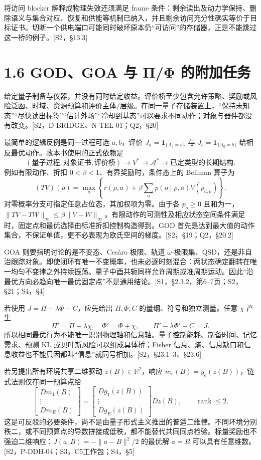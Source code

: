 \documentclass[
  11pt,
  oneside]{book}
\begin{document}
将访问 blocker 解释成物理失效还须满足 frame
条件：剩余读出及动力学保持、删除语义与集合对应、恢复和供能等机制已纳入，并且剩余访问充分性确实等价于目标证书。切断一个供电端口可能同时破坏原本仍``可访问''的存储器，正是不能跳过这一桥的例子。{[}S2，§13.3{]}

\section{1.6 GOD、GOA 与 Π/Φ 的附加任务}

给定量子制备与仪器，并没有同时给定收益。评价桥至少包含允许策略、奖励或风险泛函、时域、资源预算和评价主体/层级。在同一量子存储装置上，``保持未知态''``尽快读出标签''``估计外场''``冷却到基态''可以要求不同动作；对象与器件都没有改变。{[}S2，D-BRIDGE、N-TEL-01；Q2，§20{]}

最简单的逻辑反例是同一过程可选 \(a,b\)，评价
\(J_a=\mathbf1_{\{A_0=a\}}\) 与 \(J_b=\mathbf1_{\{A_0=b\}}\)
给相反最优动作。故本书使用的正式依赖是 \[
(\text{量子过程},\text{对象证书},\text{评价桥})
\longrightarrow V^*\longrightarrow\mathcal A^*\longrightarrow\text{已定类型的长期结构}.
\] 例如有限动作、折扣 \(0<\beta<1\)、有界奖励时，条件态上的 Bellman
算子为 \[
(TV)(\rho)=\max_a\left\{r(\rho,a)+\beta\sum_o p(o\mid\rho,a)
V(\rho_{a,o})\right\}.
\] 对零概率分支可指定任意占位态，其加权项为零。由于各 \(p_o\ge0\)
且和为一，\(\|TV-TW\|_\infty\le\beta\|V-W\|_\infty\)。有限动作的可测性及相应状态空间条件满足时，固定点和最优选择由标准折扣控制构造得到。GOD
首先是达到最大值的动作集合，不保证单值，更不必表现为欧氏空间的梯度。{[}S2，§19；Q2，§20.2{]}

GOA 则要指明讨论的是不变态、Cesàro 极限、轨道
\(\omega\)-极限集、QSD，还是非自治跟踪对象。即使闭环有唯一不变概率，也未必逐时刻混合：两状态确定翻转在唯一均匀不变律之外持续振荡。量子中酉共轭同样允许周期或准周期运动。因此``沿最优方向必趋向唯一最优固定点''不是通用结论。{[}S1，§2.3.2，第6--7页；S2，§21；S4，§4{]}

若使用 \(J=\Pi-\lambda\Phi-C\)，应先给出 \(\Pi,\Phi,C\)
的量纲、符号和独立测量。任意 \(\chi\) 产生 \[
\Pi'=\Pi+\lambda\chi,\quad \Phi'=\Phi+\chi,
\qquad \Pi'-\lambda\Phi'-C=J.
\]
所以相同最优行为不能唯一识别物理轴和信息轴。量子控制能耗、制备时间、记忆需求、预测
KL 或贝叶斯风险可以组成具体桥；Fisher
信息、熵、信息缺口和信息收益也不能只因都叫``信息''就同号相加。{[}S2，§23.1--3、§23.6{]}

若另提出所有环境共享二维驱动 \(z(B)\in\mathbb R^2\)，响应
\(m_e(B)=g_e(z(B))\)，链式法则仅在同一预算点给 \[
\begin{bmatrix}Dm_1(B)\\\vdots\\Dm_E(B)\end{bmatrix}
=\begin{bmatrix}Dg_1(z(B))\\\vdots\\Dg_E(z(B))\end{bmatrix}Dz(B),
\qquad\operatorname{rank}\le2.
\]
这是可反驳的必要条件，尚不是由量子形式主义推出的普适二维律。不同环境分别秩二，或不同预算点的导数拼接成低秩，都不能替代共同同点检验。标量奖励也不强迫二维响应：\(J(a,B)=-\|a-B\|^2/2\)
的最优解 \(a=B\)
可以具有任意维数。{[}S2，P-DDH-04；S3，C5工作包；S4，§5{]}
\end{document}
